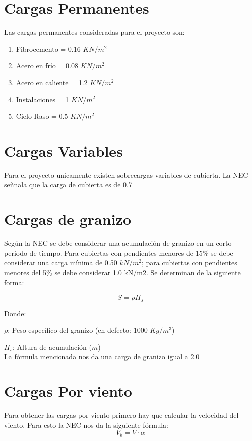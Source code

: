 \documentclass{report}
\begin{document}

\section{Cargas Permanentes}
Las cargas permanentes consideradas para el proyecto son:
\begin{enumerate}
    \item[\textbullet] Fibrocemento = 0.16 $KN/m^2$
    \item[\textbullet] Acero en fr\'io = 0.08 $KN/m^2$
    \item[\textbullet] Acero en caliente = 1.2 $KN/m^2$
    \item[\textbullet] Instalaciones = 1 $KN/m^2$
    \item[\textbullet] Cielo Raso = 0.5 $KN/m^2$
    
\end{enumerate}
\section{Cargas Variables}
Para el proyecto unicamente existen sobrecargas variables de cubierta. La NEC se\~{n}nala que
la carga de cubierta es de 0.7

\section{Cargas de granizo}
Seg\'un la NEC se debe considerar una acumulaci\'on de granizo en un corto periodo de tiempo.
Para cubiertas con pendientes menores de 15\% se debe considerar una carga m\'inima de 0.50 $kN/m^2$; 
para cubiertas con pendientes menores del 5\% se debe considerar 1.0 kN/m2. Se determinan de la siguiente forma:

$$S = \rho H_s$$

Donde:

$\rho $: Peso espec\'ifico del granizo (en defecto: 1000 $Kg/m^3$)

$H_s$: Altura de acumulaci\'on ($m$)
\\
La f\'ormula mencionada nos da una carga de granizo igual a 2.0

\section{Cargas Por viento}
Para obtener las cargas por viento primero hay que calcular la velocidad del viento. Para esto la 
NEC nos da la siguiente f\'ormula: 
$$V_b = V \cdot \alpha$$
\end{document}
